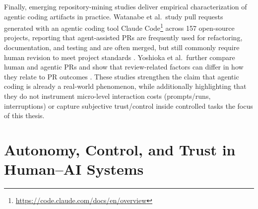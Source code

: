 Finally, emerging repository-mining studies deliver empirical characterization of agentic coding artifacts in practice. Watanabe et al.\ study pull requests generated with an agentic coding tool Claude Code\footnote{\url{https://code.claude.com/docs/en/overview}} across 157 open-source projects, reporting that agent-assisted PRs are frequently used for refactoring, documentation, and testing and are often merged, but still commonly require human revision to meet project standards \parencite{watanabe2025agenticPR}. Yoshioka et al.\ further compare human and agentic PRs and show that review-related factors can differ in how they relate to PR outcomes \parencite{yoshioka2026meaningfulPR}. These studies strengthen the claim that agentic coding is already a real-world phenomenon, while additionally highlighting that they do not instrument micro-level interaction costs (prompts/runs, interruptions) or capture subjective trust/control inside controlled tasks the focus of this thesis.


\section{Autonomy, Control, and Trust in Human--AI Systems}

\label{sec:rw-autonomy}

